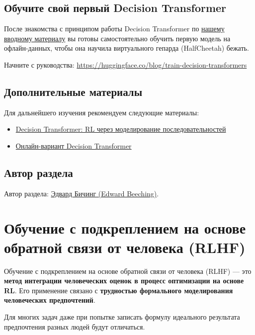 \documentclass[11pt,a4paper]{article}
\begin{document}
\subsection{Обучите свой первый Decision Transformer}\label{train-your-first-decision-transformers}

После знакомства с принципом работы Decision Transformer по \href{https://huggingface.co/blog/decision-transformers}{нашему вводному материалу} вы готовы самостоятельно обучить первую модель на офлайн-данных, чтобы она научила виртуального гепарда (HalfCheetah) бежать.

Начните с руководства: \url{https://huggingface.co/blog/train-decision-transformers}

\subsection{Дополнительные материалы}\label{further-reading-3}

Для дальнейшего изучения рекомендуем следующие материалы:

\begin{itemize}
\item
  \href{https://arxiv.org/abs/2106.01345}{Decision Transformer: RL через моделирование последовательностей}
\item
  \href{https://arxiv.org/abs/2202.05607}{Онлайн-вариант Decision Transformer}
\end{itemize}

\subsection{Автор раздела}\label{author-3}

Автор раздела: \href{https://twitter.com/edwardbeeching}{Эдвард Бичинг (Edward Beeching)}.

\section{Обучение с подкреплением на основе обратной связи от человека (RLHF)}\label{rlhf}

Обучение с подкреплением на основе обратной связи от человека (RLHF) --- это \textbf{метод интеграции человеческих оценок в процесс оптимизации на основе RL}. Его применение связано с \textbf{трудностью формального моделирования человеческих предпочтений}.

Для многих задач даже при попытке записать формулу идеального результата предпочтения разных людей будут отличаться.
\end{document}
